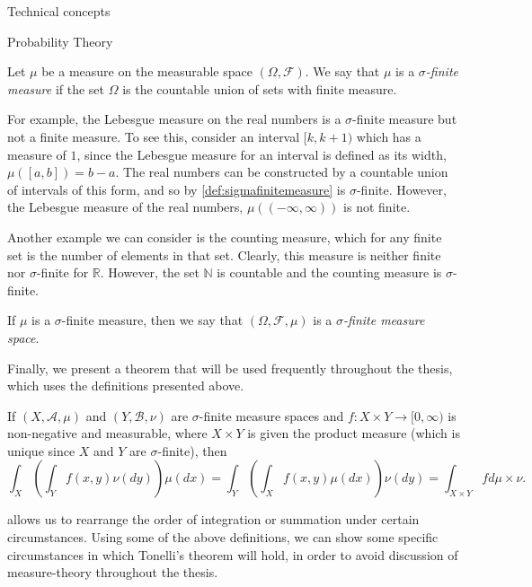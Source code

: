 \begin{section}{Technical concepts \label{sec:tc}}
\begin{subsection}{Probability Theory}
\begin{definition}
	\label{def:sigmafinitemeasure}
	Let $\mu$ be a measure on the measurable space $(\Omega,\mathcal{F})$. We say that $\mu$ is a \emph{$\sigma$-finite measure} if the set $\Omega$ is the countable union of sets with finite measure.
\end{definition}
For example, the Lebesgue measure on the real numbers is a $\sigma$-finite measure but not a finite measure. To see this, consider an interval $[k,k+1)$ which has a measure of $1$, since the Lebesgue measure for an interval is defined as its width, $\mu([a,b]) = b-a$. The real numbers can be constructed by a countable union of intervals of this form, and so by \cref{def:sigmafinitemeasure} is $\sigma$-finite. However, the Lebesgue measure of the real numbers, $\mu\left( (-\infty,\infty) \right)$ is not finite.

Another example we can consider is the counting measure, which for any finite set is the number of elements in that set. Clearly, this measure is neither finite nor $\sigma$-finite for $\mathbb{R}$. However, the set $\mathbb{N}$ is countable and the counting measure is $\sigma$-finite.
\begin{definition}
	If $\mu$ is a $\sigma$-finite measure, then we say that $(\Omega,\mathcal{F},\mu)$ is a \emph{$\sigma$-finite measure space}.
\end{definition}
Finally, we present a theorem that will be used frequently throughout the thesis, which uses the definitions presented above.
\begin{theorem}
	\label{thm:tonellistheorem}
	If $(X,\mathcal{A},\mu)$ and $(Y,\mathcal{B},\nu)$ are $\sigma$-finite measure spaces and $f:X \times Y \to [0,\infty)$ is non-negative and measurable, where $X \times Y$ is given the product measure (which is unique since $X$ and $Y$ are $\sigma$-finite), then
	\begin{equation*}
	\label{eq:tonelli}
	\int_X \left( \int_Y f(x,y)\nu(dy) \right) \mu(dx) = \int_Y \left( \int_X f(x,y)\mu(dx) \right) \nu(dy) = \int_{X \times Y} f d \mu \times \nu.
	\end{equation*}
\end{theorem}
	 allows us to rearrange the order of integration or summation under certain circumstances. 
	Using some of the above definitions, we can show some specific circumstances in which Tonelli's theorem will hold, in order to avoid discussion of measure-theory throughout the thesis.
	

\end{subsection}
\end{section}
